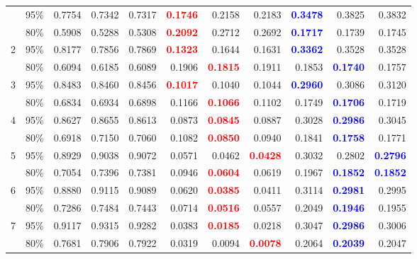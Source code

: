 \begin{longtable}[c]{ccrrrrrrrrr}
\endfoot
\bottomrule
\endlastfoot
1 & 95\% & 0.7754 & 0.7342 & 0.7317 & \textcolor{red}{\textbf{0.1746}} & 0.2158 & 0.2183 & \textcolor{blue}{\textbf{0.3478}} & 0.3825 & 0.3832 \\
 & 80\% & 0.5908 & 0.5288 & 0.5308 & \textcolor{red}{\textbf{0.2092}} & 0.2712 & 0.2692 & \textcolor{blue}{\textbf{0.1717}} & 0.1739 & 0.1745 \\
\cmidrule(lr){1-11}
2 & 95\% & 0.8177 & 0.7856 & 0.7869 & \textcolor{red}{\textbf{0.1323}} & 0.1644 & 0.1631 & \textcolor{blue}{\textbf{0.3362}} & 0.3528 & 0.3528 \\
 & 80\% & 0.6094 & 0.6185 & 0.6089 & 0.1906 & \textcolor{red}{\textbf{0.1815}} & 0.1911 & 0.1853 & \textcolor{blue}{\textbf{0.1740}} & 0.1757 \\
\cmidrule(lr){1-11}
3 & 95\% & 0.8483 & 0.8460 & 0.8456 & \textcolor{red}{\textbf{0.1017}} & 0.1040 & 0.1044 & \textcolor{blue}{\textbf{0.2960}} & 0.3086 & 0.3120 \\
 & 80\% & 0.6834 & 0.6934 & 0.6898 & 0.1166 & \textcolor{red}{\textbf{0.1066}} & 0.1102 & 0.1749 & \textcolor{blue}{\textbf{0.1706}} & 0.1719 \\
\cmidrule(lr){1-11}
4 & 95\% & 0.8627 & 0.8655 & 0.8613 & 0.0873 & \textcolor{red}{\textbf{0.0845}} & 0.0887 & 0.3028 & \textcolor{blue}{\textbf{0.2986}} & 0.3045 \\
 & 80\% & 0.6918 & 0.7150 & 0.7060 & 0.1082 & \textcolor{red}{\textbf{0.0850}} & 0.0940 & 0.1841 & \textcolor{blue}{\textbf{0.1758}} & 0.1771 \\
\cmidrule(lr){1-11}
5 & 95\% & 0.8929 & 0.9038 & 0.9072 & 0.0571 & 0.0462 & \textcolor{red}{\textbf{0.0428}} & 0.3032 & 0.2802 & \textcolor{blue}{\textbf{0.2796}} \\
 & 80\% & 0.7054 & 0.7396 & 0.7381 & 0.0946 & \textcolor{red}{\textbf{0.0604}} & 0.0619 & 0.1967 & \textcolor{blue}{\textbf{0.1852}} & \textcolor{blue}{\textbf{0.1852}} \\
\cmidrule(lr){1-11}
6 & 95\% & 0.8880 & 0.9115 & 0.9089 & 0.0620 & \textcolor{red}{\textbf{0.0385}} & 0.0411 & 0.3114 & \textcolor{blue}{\textbf{0.2981}} & 0.2995 \\
 & 80\% & 0.7286 & 0.7484 & 0.7443 & 0.0714 & \textcolor{red}{\textbf{0.0516}} & 0.0557 & 0.2049 & \textcolor{blue}{\textbf{0.1946}} & 0.1955 \\
\cmidrule(lr){1-11}
7 & 95\% & 0.9117 & 0.9315 & 0.9282 & 0.0383 & \textcolor{red}{\textbf{0.0185}} & 0.0218 & 0.3047 & \textcolor{blue}{\textbf{0.2986}} & 0.3006 \\
 & 80\% & 0.7681 & 0.7906 & 0.7922 & 0.0319 & 0.0094 & \textcolor{red}{\textbf{0.0078}} & 0.2064 & \textcolor{blue}{\textbf{0.2039}} & 0.2047 \\

\end{longtable}
